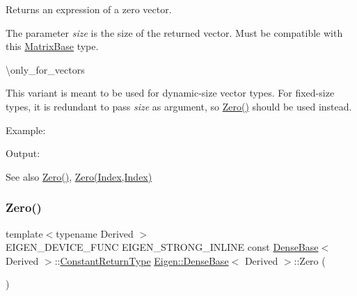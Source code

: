 \begin{DoxyReturn}{Returns}
an expression of a zero vector.
\end{DoxyReturn}
The parameter {\itshape size} is the size of the returned vector. Must be compatible with this \mbox{\hyperlink{class_eigen_1_1_matrix_base}{Matrix\+Base}} type.

\textbackslash{}only\+\_\+for\+\_\+vectors

This variant is meant to be used for dynamic-\/size vector types. For fixed-\/size types, it is redundant to pass {\itshape size} as argument, so \mbox{\hyperlink{class_eigen_1_1_dense_base_a8c4be762b10041d64a2b2ce85bb14ba0}{Zero()}} should be used instead.

Example\+: 
\begin{DoxyCodeInclude}{0}
\end{DoxyCodeInclude}
 Output\+: 
\begin{DoxyVerbInclude}
\end{DoxyVerbInclude}


\begin{DoxySeeAlso}{See also}
\mbox{\hyperlink{class_eigen_1_1_dense_base_a8c4be762b10041d64a2b2ce85bb14ba0}{Zero()}}, \mbox{\hyperlink{class_eigen_1_1_dense_base_a3832aa9b2ee9ebdb4458003c742c9027}{Zero(\+Index,\+Index)}} 
\end{DoxySeeAlso}
\mbox{\label{class_eigen_1_1_dense_base_a8c4be762b10041d64a2b2ce85bb14ba0}} 
\subsubsection{\texorpdfstring{Zero()}{Zero()}\hspace{0.1cm}{\footnotesize\ttfamily [3/3]}}
{\footnotesize\ttfamily template$<$typename Derived $>$ \\
E\+I\+G\+E\+N\+\_\+\+D\+E\+V\+I\+C\+E\+\_\+\+F\+U\+NC E\+I\+G\+E\+N\+\_\+\+S\+T\+R\+O\+N\+G\+\_\+\+I\+N\+L\+I\+NE const \mbox{\hyperlink{class_eigen_1_1_dense_base}{Dense\+Base}}$<$ Derived $>$\+::\mbox{\hyperlink{class_eigen_1_1_cwise_nullary_op}{Constant\+Return\+Type}} \mbox{\hyperlink{class_eigen_1_1_dense_base}{Eigen\+::\+Dense\+Base}}$<$ Derived $>$\+::Zero (\begin{DoxyParamCaption}{ }\end{DoxyParamCaption})\hspace{0.3cm}{\ttfamily [static]}}

